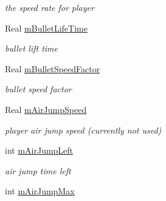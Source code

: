 \begin{DoxyCompactItemize}
\begin{DoxyCompactList}\small\item\em the speed rate for player \end{DoxyCompactList}\item 
Real \hyperlink{class_basic_tutorial__00_a30c30dbab84babfc29fb95c026af04ac}{m\+Bullet\+Life\+Time}\hypertarget{class_basic_tutorial__00_a30c30dbab84babfc29fb95c026af04ac}{}\label{class_basic_tutorial__00_a30c30dbab84babfc29fb95c026af04ac}

\begin{DoxyCompactList}\small\item\em bullet lift time \end{DoxyCompactList}\item 
Real \hyperlink{class_basic_tutorial__00_a2ba5a47eb3dfab049aafafcee0620fac}{m\+Bullet\+Speed\+Factor}\hypertarget{class_basic_tutorial__00_a2ba5a47eb3dfab049aafafcee0620fac}{}\label{class_basic_tutorial__00_a2ba5a47eb3dfab049aafafcee0620fac}

\begin{DoxyCompactList}\small\item\em bullet speed factor \end{DoxyCompactList}\item 
Real \hyperlink{class_basic_tutorial__00_a152a7b0fc73894847589ebb4faf28067}{m\+Air\+Jump\+Speed}\hypertarget{class_basic_tutorial__00_a152a7b0fc73894847589ebb4faf28067}{}\label{class_basic_tutorial__00_a152a7b0fc73894847589ebb4faf28067}

\begin{DoxyCompactList}\small\item\em player air jump speed (currently not used) \end{DoxyCompactList}\item 
int \hyperlink{class_basic_tutorial__00_ab655d56fb51268b3edfa38059be04fc3}{m\+Air\+Jump\+Left}\hypertarget{class_basic_tutorial__00_ab655d56fb51268b3edfa38059be04fc3}{}\label{class_basic_tutorial__00_ab655d56fb51268b3edfa38059be04fc3}

\begin{DoxyCompactList}\small\item\em air jump time left \end{DoxyCompactList}\item 
int \hyperlink{class_basic_tutorial__00_a58590c7cf95e3a9d38dbfb4e25c9068f}{m\+Air\+Jump\+Max}\hypertarget{class_basic_tutorial__00_a58590c7cf95e3a9d38dbfb4e25c9068f}{}\label{class_basic_tutorial__00_a58590c7cf95e3a9d38dbfb4e25c9068f}


\end{DoxyCompactItemize}
